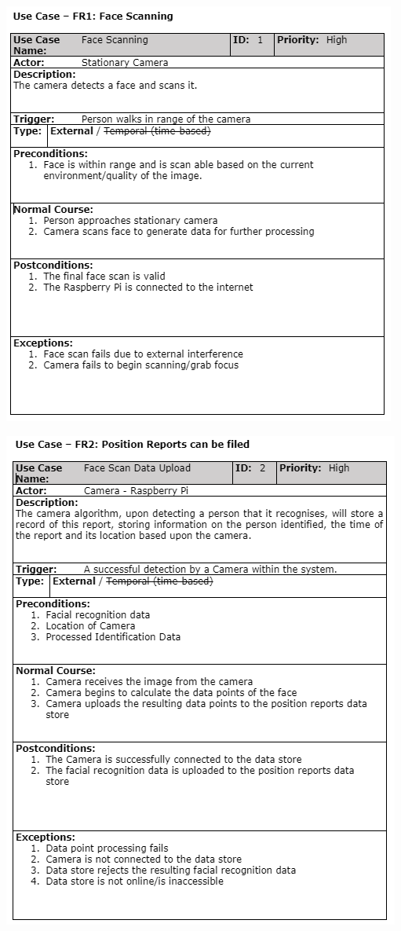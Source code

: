 \documentclass[
  english,
  a4paper,
,tablecaptionabove
]{scrartcl}
\begin{document}
\includegraphics{images/ppm-images/use-case-1.png} \newpage

\includegraphics{images/ppm-images/use-case-2.png} \newpage
\end{document}
